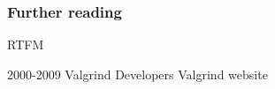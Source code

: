 \documentclass{beamer}
\begin{document}
\begin{frame}[allowframebreaks]
  \frametitle<presentation>{Further reading}
    
  \begin{thebibliography}{10}
    
  \beamertemplatebookbibitems
    RTFM

    
  \beamertemplatearticlebibitems

  \beamertemplatearticlebibitems
    2000-2009 Valgrind Developers
    \newblock Valgrind website
    \newblock {}

  \end{thebibliography}
\end{frame}
\end{document}
